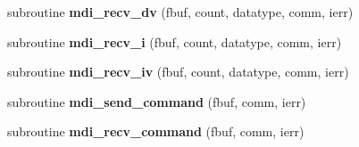 \begin{DoxyCompactItemize}
\item 
\hypertarget{classmdi_a702f07d3972442a7e2192344cbc39591}{subroutine {\bfseries mdi\-\_\-recv\-\_\-dv} (fbuf, count, datatype, comm, ierr)}\label{classmdi_a702f07d3972442a7e2192344cbc39591}

\item 
\hypertarget{classmdi_a6db12fbef0c2a759ef7b44d55ade27e6}{subroutine {\bfseries mdi\-\_\-recv\-\_\-i} (fbuf, count, datatype, comm, ierr)}\label{classmdi_a6db12fbef0c2a759ef7b44d55ade27e6}

\item 
\hypertarget{classmdi_a44067a3dc1c77a4c0263f070e65e0da6}{subroutine {\bfseries mdi\-\_\-recv\-\_\-iv} (fbuf, count, datatype, comm, ierr)}\label{classmdi_a44067a3dc1c77a4c0263f070e65e0da6}

\item 
\hypertarget{classmdi_ab16198c5de2102500ab27e0d69df8487}{subroutine {\bfseries mdi\-\_\-send\-\_\-command} (fbuf, comm, ierr)}\label{classmdi_ab16198c5de2102500ab27e0d69df8487}

\item 
\hypertarget{classmdi_a2b09a1c50a57cc6fe253985b530993ec}{subroutine {\bfseries mdi\-\_\-recv\-\_\-command} (fbuf, comm, ierr)}\label{classmdi_a2b09a1c50a57cc6fe253985b530993ec}

\end{DoxyCompactItemize}
